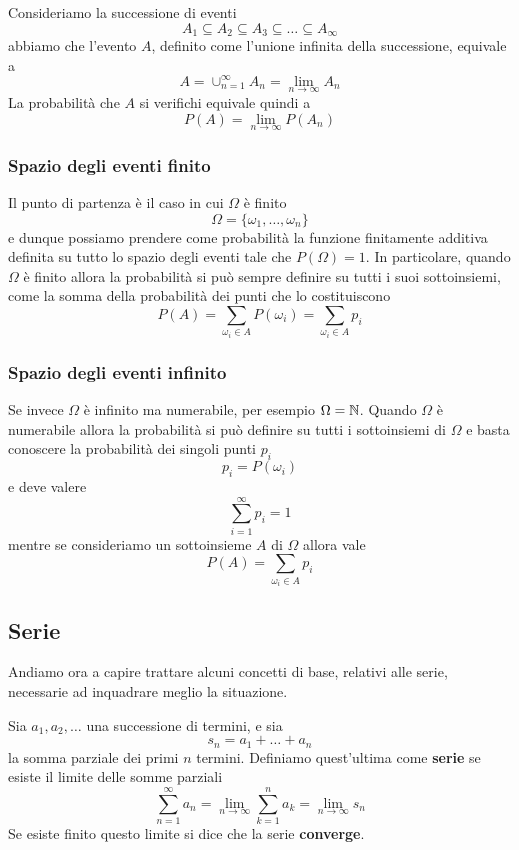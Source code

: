 Consideriamo la successione di eventi
\[ A_1 \subseteq A_2 \subseteq A_3 \subseteq \dots \subseteq A_\infty \]
abbiamo che l'evento $A$, definito come l'unione infinita della successione, equivale a
\[ A = \cup_{n=1}^\infty A_n = \lim_{n \to \infty} A_n \]
La probabilità che $A$ si verifichi equivale quindi a
\[ P(A) = \lim_{n \to \infty} P(A_n) \]

\subsubsection{Spazio degli eventi finito}
Il punto di partenza è il caso in cui $\Omega$ è finito
\[ \Omega = \{ \omega_1, \dots, \omega_n \} \]
e dunque possiamo prendere come probabilità la funzione finitamente additiva definita su tutto lo spazio
degli eventi tale che $P(\Omega) = 1$. In particolare, quando $\Omega$ è finito allora la probabilità si
può sempre definire su tutti i suoi sottoinsiemi, come la somma della probabilità dei punti che lo
costituiscono
\[ P(A) = \sum_{\omega_i \in A} P(\omega_i) = \sum_{\omega_i \in A} p_i \]

\subsubsection{Spazio degli eventi infinito}
Se invece $\Omega$ è infinito ma numerabile, per esempio $\Omega = \mathbb{N}$. Quando $\Omega$ è numerabile allora
la probabilità si può definire su tutti i sottoinsiemi di $\Omega$ e basta conoscere la probabilità dei
singoli punti $p_i$
\[ p_i = P(\omega_i) \]
e deve valere
\[ \sum_{i=1}^\infty p_i = 1 \]
mentre se consideriamo un sottoinsieme $A$ di $\Omega$ allora vale
\[ P(A) = \sum_{\omega_i \in A} p_i \]

\subsection{Serie}
Andiamo ora a capire trattare alcuni concetti di base, relativi alle serie, necessarie ad inquadrare meglio
la situazione.

\begin{definition}
	Sia $a_1, a_2, \dots$ una successione di termini, e sia
	\[ s_n = a_1 + \dots + a_n \]
	la somma parziale dei primi $n$ termini. Definiamo quest'ultima come \textbf{serie} se esiste il limite
	delle somme parziali
	\[ \sum_{n=1}^\infty a_n = \lim_{n \to \infty} \sum_{k=1}^n a_k = \lim_{n \to \infty} s_n \]
	Se esiste finito questo limite si dice che la serie \textbf{converge}.
\end{definition}

